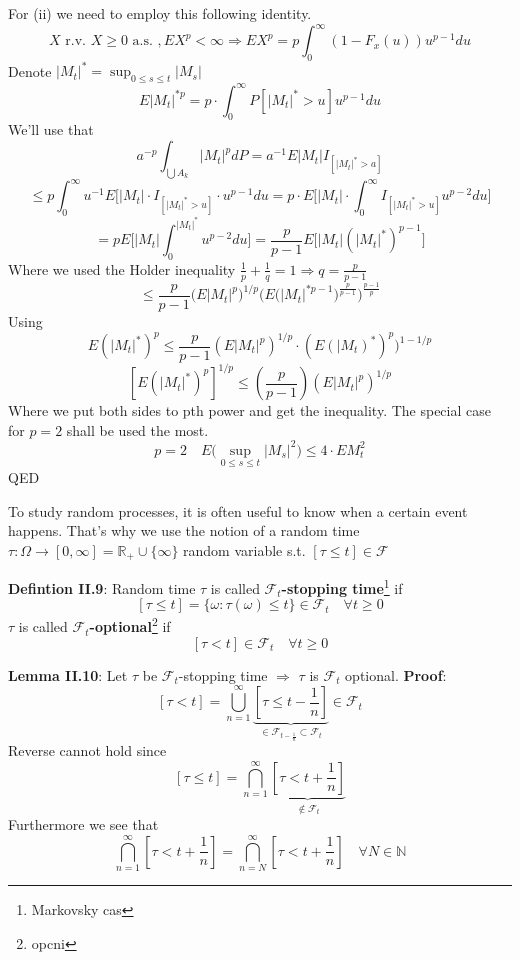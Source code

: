 \documentclass[english]{article}
\newcommand{\R}{\mathbb{R}}
\newcommand{\N}{\mathbb{N}}
\newcommand{\ub}{\underbrace}
\newcommand{\note}[1]{\noindent\textbf{#1}}
\newcommand{\F}{\mathcal F}
\begin{document}
For (ii) we need to employ this following identity.
$$X\text{ r.v. } X\geq 0 \text{ a.s. }, EX^p< \infty \Rightarrow EX^p = p \int^\infty_{0} (1-F_x(u))u^{p-1} du$$
Denote $|M_t|^* = \sup_{0\leq s \leq t} |M_s|$
$$E|M_t|^{\ast p} = p \cdot \int^\infty_0 P[|M_t|^\ast > u] u^{p-1} du$$
We'll use that 
$$ a^{-p} \int_{\bigcup A_k} |M_t|^p dP = a^{-1} E|M_t| I_{[|M_t|^* > a]}$$
$$\leq p \int^\infty_0 u^{-1} E[|M_t| \cdot I_{[|M_t|^* > u]} \cdot u^{p-1} du = p\cdot E\bigg[|M_t| \cdot \int^\infty_{0} I_{[|M_t|^* > u]} u^{p-2} du\bigg] $$
$$= p E\bigg[ |M_t| \int^{|M_t|^*}_0 u^{p-2} du \bigg] = \frac{p}{p-1} E\bigg[|M_t| (|M_t|^*)^{p-1}\bigg]$$
Where we used the Holder inequality $\frac 1p + \frac 1q = 1 \Rightarrow q = \frac{p}{p-1}$
$$\leq \frac{p}{p-1} \bigg(E|M_t|^p\bigg)^{1/p} \Bigg(E\bigg(|M_t|^{* p-1}\bigg)^{\frac p{p-1}}\Bigg)^{\frac {p-1}p}$$
Using
$$E(|M_t|^*)^p \leq \frac{p}{p-1} (E|M_t|^p)^{1/p} \cdot (E(|M_t)^*)^p)^{1-1/p}$$
$$[E(|M_t|^*)^p]^{1/p} \leq (\frac{p}{p-1}) (E|M_t|^p)^{1/p}$$
Where we put both sides to pth power and get the inequality. The special case for $p=2$ shall be used the most.
$$p=2\quad E\Big(\sup_{0\leq s \leq t} |M_s|^2\Big) \leq 4\cdot EM^2_t$$
QED\newline

To study random processes, it is often useful to know when a certain event happens. That's why we use the notion of a random time $\tau:\Omega \to [0,\infty]=\R_+ \cup \{\infty\}$ random variable s.t. $[\tau \leq t] \in \F$ \newline

\note{Defintion II.9}: Random time $\tau$ is called $\F_t$\textbf{-stopping time}\footnote{Markovsky cas} if 
$$[\tau \leq t ] = \{\omega: \tau(\omega) \leq  t \} \in \F_t \quad \forall t\geq 0$$
$\tau$ is called $\F_t$\textbf{-optional}\footnote{opcni} if 
$$[\tau < t] \in \F_t \quad \forall t\geq 0$$

\note{Lemma II.10}: Let $\tau$ be $\F_t$-stopping time $\Rightarrow$ $\tau$ is $\F_t$ optional. \newline
\note{Proof}:
$$[\tau < t ] = \bigcup^\infty_{n=1} \ub{[\tau \leq t- \frac 1n ]}_{\in \F_{t-\frac 1n} \subset \F_t} \in \F_t$$
Reverse cannot hold since
$$[\tau \leq t ] = \bigcap^\infty_{n=1} \ub{[\tau < t + \frac 1n ]}_{\notin \F_t}$$
Furthermore we see that 
$$\bigcap^\infty_{n=1} [\tau < t + \frac 1n] = \bigcap^\infty_{n=N} [\tau < t + \frac 1n ] \quad \forall N \in \N$$
\end{document}
